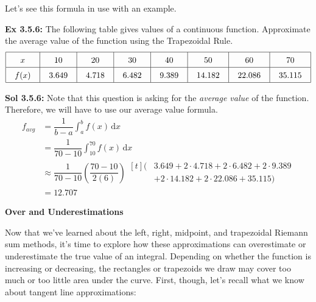 Let's see this formula in use with an example. \par

\begin{tcolorbox}[example]
    \textbf{Ex 3.5.6: } The following table gives values of a continuous function. Approximate the average value of the function using the Trapezoidal Rule.
    \begin{align*}
        \arraycolsep=11pt\def\arraystretch{1.5}
        \begin{array}{|c|c|c|c|c|c|c|c|}
            \hline
            x & 10 & 20 & 30 & 40 & 50 & 60 & 70 \\ \hline
            f(x) & 3.649 & 4.718 & 6.482 & 9.389 & 14.182 & 22.086 & 35.115 \\
            \hline
        \end{array}
    \end{align*}
\end{tcolorbox}
\begin{tcolorbox}[solution]
    \textbf{Sol 3.5.6: } Note that this question is asking for the \textit{average value} of the function. Therefore, we will have to use our average value formula. \begin{align*} 
        f_{avg} &= \dfrac{1}{b - a}\int_a^b f(x) \,\mathrm{d}x \\[11pt]
        & = \dfrac{1}{70 - 10}\int_{10}^{70} f(x) \,\mathrm{d}x \\[11pt]
        & \approx \dfrac{1}{70 - 10}\left(\dfrac{70 - 10}{2(6)}\right)\begin{aligned}[t]
            (&3.649 + 2 \cdot 4.718 + 2 \cdot 6.482 + 2 \cdot 9.389 \\[5.5pt]
            & + 2 \cdot 14.182 + 2 \cdot 22.086 + 35.115)
        \end{aligned} \\[11pt]
        & = \boxed{12.707}
    \end{align*} 
\end{tcolorbox}

\bigskip

\textbf{\large{Over and Underestimations}} \par

Now that we've learned about the left, right, midpoint, and trapezoidal Riemann sum methods, it's time to explore how these approximations can overestimate or underestimate the true value of an integral. Depending on whether the function is increasing or decreasing, the rectangles or trapezoids we draw may cover too much or too little area under the curve. First, though, let's recall what we know about tangent line approximations: \par

